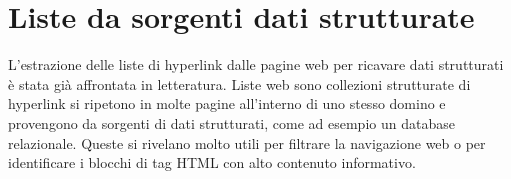 




\section{Liste da sorgenti dati strutturate}
L'estrazione delle liste di hyperlink dalle pagine web per ricavare dati strutturati è stata già affrontata in letteratura. Liste web sono collezioni strutturate di hyperlink si ripetono in molte pagine all'interno di uno stesso domino e provengono da sorgenti di dati strutturati, come ad esempio un database relazionale. Queste si rivelano molto utili per filtrare la navigazione web o per identificare i blocchi di tag HTML con alto contenuto informativo. 

